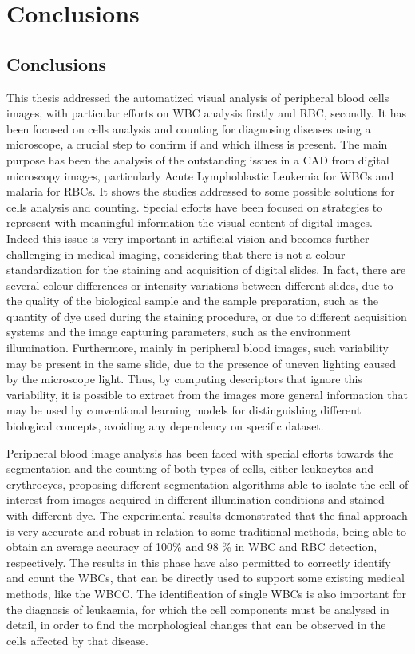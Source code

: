 \documentclass[final,a4paper,12pt,english]{UnicaPhdThesis3}
\begin{document}
\part{Conclusions} 
\chapter*{Conclusions} \label{tre}
This thesis addressed the automatized visual analysis of peripheral blood cells images, with particular efforts on WBC analysis firstly and RBC, secondly. It has been focused on cells analysis and counting for diagnosing diseases using a microscope, a crucial step to confirm if and which illness is present. The main purpose has been the analysis of the outstanding issues in a CAD from digital microscopy images, particularly Acute Lymphoblastic Leukemia for WBCs and malaria for RBCs. It shows the studies addressed to some possible solutions for cells analysis and counting. Special efforts have been focused on strategies to represent with meaningful information the visual content of digital images. Indeed this issue is very important in artificial vision and becomes further challenging in medical imaging, considering that there is not a colour standardization for the staining and acquisition of digital slides. In fact, there are several colour differences or intensity variations between different slides, due to the quality of the biological sample and the sample preparation, such as the quantity of dye used during the staining procedure, or due to different acquisition systems and the image capturing parameters, such as the environment illumination. Furthermore, mainly in peripheral blood images, such variability may be present in the same slide, due to the presence of uneven lighting caused by the microscope light. Thus, by computing descriptors that ignore this variability, it is possible to extract from the images more general information that may be used by conventional learning models for distinguishing different biological concepts, avoiding any dependency on specific dataset. 

Peripheral blood image analysis has been faced with special efforts towards the segmentation and the counting of both types of cells, either leukocytes and erythrocyes, proposing different segmentation algorithms able to isolate the cell of interest from images acquired in different illumination conditions and stained with different dye. 
The experimental results demonstrated that the final approach is very accurate and robust in relation to some traditional methods, being able to obtain an average accuracy of 100\% and 98 \% in WBC and RBC detection, respectively. The results in this phase have also permitted to correctly identify and count the WBCs, that can be directly used to support some existing medical methods, like the WBCC. 
The identification of single WBCs is also important for the diagnosis of leukaemia, for which the cell components must be analysed in detail, in order to find the morphological changes that can be observed in the cells affected by that disease.
\end{document}
